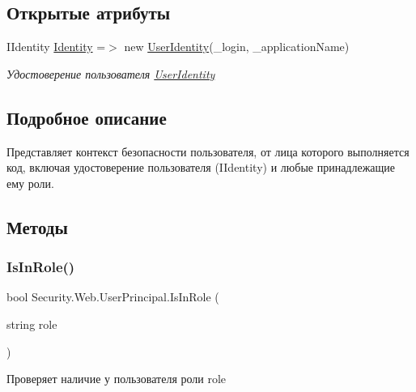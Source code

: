 \subsection*{Открытые атрибуты}
\begin{DoxyCompactItemize}
\item 
I\+Identity \hyperlink{class_security_1_1_web_1_1_user_principal_aff69e614d55b6ae2497d8c9e42b08557}{Identity} =$>$ new \hyperlink{class_security_1_1_web_1_1_user_identity}{User\+Identity}(\+\_\+login, \+\_\+application\+Name)
\begin{DoxyCompactList}\small\item\em Удостоверение пользователя \hyperlink{class_security_1_1_web_1_1_user_identity}{User\+Identity} \end{DoxyCompactList}\end{DoxyCompactItemize}


\subsection{Подробное описание}
Представляет контекст безопасности пользователя, от лица которого выполняется код, включая удостоверение пользователя (I\+Identity) и любые принадлежащие ему роли. 



\subsection{Методы}
\mbox{\label{class_security_1_1_web_1_1_user_principal_a3cf055fe8bf4df333a1285f9d1d33f3a}} 
\subsubsection{\texorpdfstring{Is\+In\+Role()}{IsInRole()}}
{\footnotesize\ttfamily bool Security.\+Web.\+User\+Principal.\+Is\+In\+Role (\begin{DoxyParamCaption}\item[{string}]{role }\end{DoxyParamCaption})}



Проверяет наличие у пользователя роли role 



